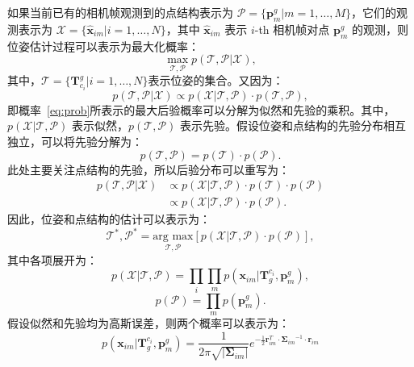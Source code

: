 如果当前已有的相机帧观测到的点结构表示为 $\mathcal{P} = \{\symbf{p}^g_m | m = 1, \dots, M\}$，它们的观测表示为 $\mathcal{X} = \{\hat{\symbf{x}}_{im}|i=1,\dots, N\}$，其中 $\hat{\symbf{x}}_{im}$ 表示 $i$-th 相机帧对点 $\symbf{p}^g_m$ 的观测，则位姿估计过程可以表示为最大化概率：
\begin{equation}
\label{eq:prob}
  \max_{\mathcal{T}, \mathcal{P}} p(\mathcal{T}, \mathcal{P} | \mathcal{X}),
\end{equation}
其中，$\mathcal{T} = \{ \symbf{T}_{c_i}^g | i=1,\dots, N\}$表示位姿的集合。又因为：
\begin{equation}
p(\mathcal{T}, \mathcal{P} | \mathcal{X}) \propto p(\mathcal{X} | \mathcal{T}, \mathcal{P}) \cdot p(\mathcal{T}, \mathcal{P}),
\end{equation}
即概率~\eqref{eq:prob}所表示的最大后验概率可以分解为似然和先验的乘积。其中，$p(\mathcal{X} | \mathcal{T}, \mathcal{P})$ 表示似然，$p(\mathcal{T}, \mathcal{P})$ 表示先验。假设位姿和点结构的先验分布相互独立，可以将先验分解为：
\begin{equation}
  p(\mathcal{T}, \mathcal{P}) = p(\mathcal{T}) \cdot p(\mathcal{P}).
\end{equation}
此处主要关注点结构的先验，所以后验分布可以重写为：
\begin{equation}
\begin{aligned}
  p(\mathcal{T}, \mathcal{P} | \mathcal{X}) &\propto p(\mathcal{X} | \mathcal{T}, \mathcal{P}) \cdot p(\mathcal{T}) \cdot p(\mathcal{P}) \\
  &\propto p(\mathcal{X} | \mathcal{T}, \mathcal{P}) \cdot p(\mathcal{P}).
\end{aligned}
\end{equation}
因此，位姿和点结构的估计可以表示为：
\begin{equation}
  \label{eq:max_post}
  \mathcal{T}^*, \mathcal{P}^* = \underset{\mathcal{T}, \mathcal{P}}{\text{arg max}} \left[ p(\mathcal{X} | \mathcal{T}, \mathcal{P}) \cdot p(\mathcal{P}) \right],
\end{equation}
其中各项展开为：
\begin{equation}
p(\mathcal{X} | \mathcal{T}, \mathcal{P}) = \prod_i \prod_m p(\symbf{x}_{im} | \symbf{T}_g^{c_i}, \symbf{p}_m^g),
\end{equation}
\begin{equation}
p(\mathcal{P}) = \prod_m p(\symbf{p}_m^g).
\end{equation}
假设似然和先验均为高斯误差，则两个概率可以表示为：
\begin{equation}
  p(\symbf{x}_{im} | \symbf{T}_g^{c_i}, \symbf{p}_m^g) = \frac{1}{2\pi\sqrt{|\symbf{\Sigma}_{im}|}}e^{-\frac{1}{2}\symbf{r}_{im}^T \cdot {\symbf{\Sigma}_{im}}^{-1}\cdot \symbf{r}_{im}}
\end{equation}
